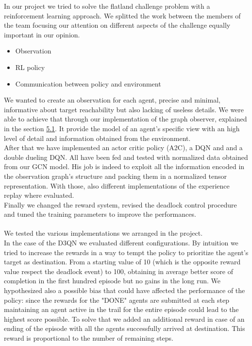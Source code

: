 In our project we tried to solve the flatland challenge problem with a reinforcement learning approach. We splitted the work between the members of the team focusing our attention on different aspects of the challenge equally important in our opinion.
\begin{itemize}
	\item Observation
	\item RL policy 
	\item Communication between policy and environment
\end{itemize}
We wanted to create an observation for each agent, precise and minimal, informative  about target reachability but also lacking of useless details. We were able to achieve that through our implementation of the graph observer, explained in the section \hyperref[sec:dagObserv]{5.1}. It provide the model of an agent's specific view with an high level of detail and information obtained from the environment. \\
After that we have implemented an actor critic policy (A2C), a DQN and and a double dueling DQN. All have been fed and tested with normalized data obtained from our GCN model. His job is indeed to exploit all the information encoded in the observation graph's structure and packing them in a normalized tensor representation. With those, also different implementations of the experience replay where evaluated.\\ 
Finally we changed the reward system, revised the deadlock control procedure and tuned the training parameters to improve the performances.\\
\\
\noindent
We tested the various implementations we arranged in the project.\\
In the case of the D3QN we evaluated different configurations. By intuition we tried to increase the rewards in a way to tempt the policy to prioritize the agent's target as destination. From a starting value of 10 (which is the opposite reward value respect the deadlock event) to 100, obtaining in average better score of completion in the first hundred episode but no gains in the long run.
We hypothesized also a possible bias that could have affected the performance of the policy: since the rewards for the "DONE" agents are submitted at each step maintaining an agent active in the trail for the entire episode could lead to the highest score possible. To solve that we added an additional reward in case of an ending of the episode with all the agents successfully arrived at destination. This reward is proportional to the number of remaining steps.\\
